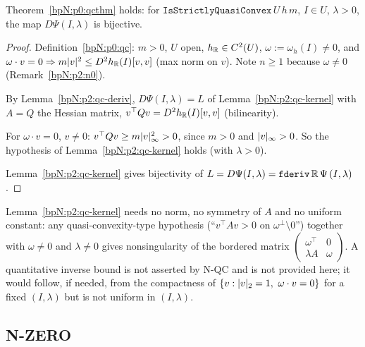 \begin{theorem}[N-QC]\label{bpN:p2:qc-bij}
Theorem~\ref{bpN:p0:qcthm} holds: for $\texttt{IsStrictlyQuasiConvex}\,U\,h\,m$, $I\in U$, $\lambda>0$, the map $D\Psi(I,\lambda)$ is bijective.
\end{theorem}
\begin{proof}
\label{stepN:p2:qb-unpack} Definition~\ref{bpN:p0:qc}: $m>0$, $U$ open, $h_{\mathbb{R}}\in C^2(U)$, $\omega:=\omega_h(I)\ne0$, and $\omega\cdot v=0\Rightarrow m\lvert v\rvert^2\le D^2h_{\mathbb{R}}(I)[v,v]$ (max norm on $v$). Note $n\ge1$ because $\omega\ne0$ (Remark~\ref{bpN:p2:n0}).

\label{stepN:p2:qb-deriv} By Lemma~\ref{bpN:p2:qc-deriv}, $D\Psi(I,\lambda)=L$ of Lemma~\ref{bpN:p2:qc-kernel} with $A=Q$ the Hessian matrix, $v^\top Qv=D^2h_{\mathbb{R}}(I)[v,v]$ (bilinearity).

\label{stepN:p2:qb-pos} For $\omega\cdot v=0$, $v\ne0$: $v^\top Qv\ge m\lvert v\rvert_\infty^2>0$, since $m>0$ and $\lvert v\rvert_\infty>0$. So the hypothesis of Lemma~\ref{bpN:p2:qc-kernel} holds (with $\lambda>0$).

\label{stepN:p2:qb-concl} Lemma~\ref{bpN:p2:qc-kernel} gives bijectivity of $L=D\Psi(I,\lambda)=\texttt{fderiv}\,\mathbb{R}\,\Psi\,(I,\lambda)$.
\end{proof}

\begin{remark}\label{bpN:p2:qc-reuse}
Lemma~\ref{bpN:p2:qc-kernel} needs no norm, no symmetry of $A$ and no uniform constant: any quasi-convexity-type hypothesis (``$v^\top Av>0$ on $\omega^\perp\setminus0$'') together with $\omega\ne0$ and $\lambda\ne0$ gives nonsingularity of the bordered matrix $\begin{pmatrix}\omega^\top&0\\\lambda A&\omega\end{pmatrix}$. A quantitative inverse bound is not asserted by N-QC and is not provided here; it would follow, if needed, from the compactness of $\{v:\lvert v\rvert_2=1,\ \omega\cdot v=0\}$ for a fixed $(I,\lambda)$ but is not uniform in $(I,\lambda)$.
\end{remark}

\subsection{N-ZERO}\label{bpN:p2:s-zero}

